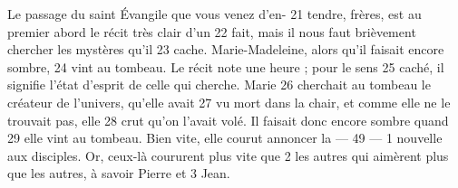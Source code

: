 Le passage du saint Évangile que vous venez d'en-	 
21	 	tendre, frères, est au premier abord le récit très clair d'un	 
22	 	fait, mais il nous faut brièvement chercher les mystères qu'il	 
23	 	cache. Marie-Madeleine, alors qu'il faisait encore sombre,	 
24	 	vint au tombeau. Le récit note une heure ; pour le sens	 
25	 	caché, il signifie l'état d'esprit de celle qui cherche. Marie	 
26	 	cherchait au tombeau le créateur de l'univers, qu'elle avait	 
27	 	vu mort dans la chair, et comme elle ne le trouvait pas, elle	 
28	 	crut qu'on l'avait volé. Il faisait donc encore sombre quand	 
29	 	elle vint au tombeau. Bien vite, elle courut annoncer la	 
 	--- 49 ---	 
1	 	nouvelle aux disciples. Or, ceux-là coururent plus vite que	 
2	 	les autres qui aimèrent plus que les autres, à savoir Pierre et	 
3	 	Jean.